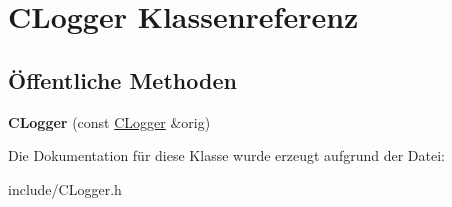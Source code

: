 \hypertarget{class_c_logger}{\section{\-C\-Logger \-Klassenreferenz}
\label{class_c_logger}
}
\subsection*{Öffentliche \-Methoden}
\begin{DoxyCompactItemize}
\item 
\hypertarget{class_c_logger_ae6294be64612845abd2d5847cdd786e9}{{\bfseries \-C\-Logger} (const \hyperlink{class_c_logger}{\-C\-Logger} \&orig)}\label{class_c_logger_ae6294be64612845abd2d5847cdd786e9}

\end{DoxyCompactItemize}


\-Die \-Dokumentation für diese \-Klasse wurde erzeugt aufgrund der \-Datei\-:\begin{DoxyCompactItemize}
\item 
include/\-C\-Logger.\-h\end{DoxyCompactItemize}
